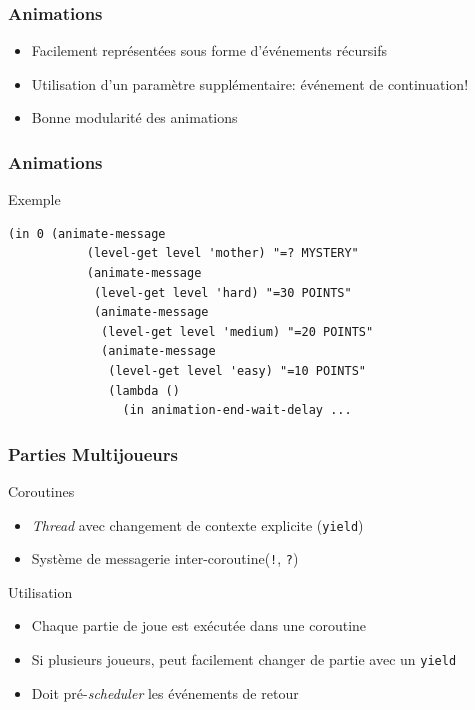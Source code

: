 \documentclass{beamer}
\newcommand{\<}[1]{\`#1}
\begin{document}
\begin{frame}
  \frametitle{Animations}
  \begin{itemize}
  \item Facilement représentées sous forme d'événements récursifs
  \item Utilisation d'un paramètre supplémentaire: événement de continuation!
  \item Bonne modularité des animations
  \end{itemize}
\end{frame}

\begin{frame}[fragile]
  \frametitle{Animations}
  \begin{block}{Exemple}
    \begin{lstlisting}[basicstyle=\footnotesize]
(in 0 (animate-message
           (level-get level 'mother) "=? MYSTERY"
           (animate-message
            (level-get level 'hard) "=30 POINTS"
            (animate-message
             (level-get level 'medium) "=20 POINTS"
             (animate-message
              (level-get level 'easy) "=10 POINTS"
              (lambda ()
                (in animation-end-wait-delay ...
    \end{lstlisting}
  \end{block}
\end{frame}

\begin{frame}
  \frametitle{Parties Multijoueurs}

  \begin{block}{Coroutines}
    \begin{itemize}
    \item \textit{Thread} avec changement de contexte explicite
      (\texttt{yield})
    \item Système de messagerie inter-coroutine(\texttt{!}, \texttt{?})
    \end{itemize}
  \end{block}

  \begin{block}{Utilisation}
    \begin{itemize}
    \item Chaque partie de joue est exécutée dans une coroutine
    \item Si plusieurs joueurs, peut facilement changer de partie avec
      un \texttt{yield}
    \item Doit pré-\textit{scheduler} les événements de retour
    \end{itemize}
  \end{block}
\end{frame}
\end{document}
